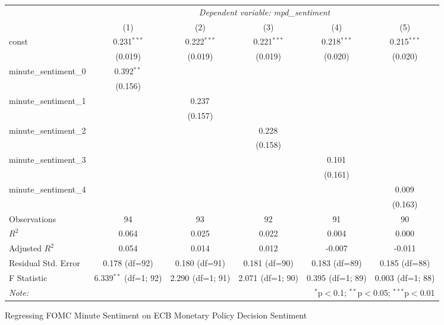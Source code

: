 \documentclass{article}
\begin{document}
\begin{table}[H] 
\centering
\begin{tabular}{@{}lccccc@{}}
\hline \hline
& \multicolumn{5}{c}{\textit{Dependent variable: mpd\_sentiment}} \\
\cline{2-6}
& (1) & (2) & (3) & (4) & (5) \\
\hline
const & 0.231$^{***}$ & 0.222$^{***}$ & 0.221$^{***}$ & 0.218$^{***}$ & 0.215$^{***}$ \\
& (0.019) & (0.019) & (0.019) & (0.020) & (0.020) \\
minute\_sentiment\_0 & 0.392$^{**}$ & & & & \\
& (0.156) & & & & \\
minute\_sentiment\_1 & & 0.237$^{}$ & & & \\
& & (0.157) & & & \\
minute\_sentiment\_2 & & & 0.228$^{}$ & & \\
& & & (0.158) & & \\
minute\_sentiment\_3 & & & & 0.101$^{}$ & \\
& & & & (0.161) & \\
minute\_sentiment\_4 & & & & & 0.009$^{}$ \\
& & & & & (0.163) \\
\hline
Observations & 94 & 93 & 92 & 91 & 90 \\
$R^2$ & 0.064 & 0.025 & 0.022 & 0.004 & 0.000 \\
Adjusted $R^2$ & 0.054 & 0.014 & 0.012 & -0.007 & -0.011 \\
Residual Std. Error & 0.178 (df=92) & 0.180 (df=91) & 0.181 (df=90) & 0.183 (df=89) & 0.185 (df=88) \\
F Statistic & 6.339$^{**}$ (df=1; 92) & 2.290$^{}$ (df=1; 91) & 2.071$^{}$ (df=1; 90) & 0.395$^{}$ (df=1; 89) & 0.003$^{}$ (df=1; 88) \\
\hline \hline
\textit{Note:} & \multicolumn{5}{r}{$^{*}$p$<$0.1; $^{**}$p$<$0.05; $^{***}$p$<$0.01} \\
\end{tabular}
\end{table}


Regressing FOMC Minute Sentiment on ECB Monetary Policy Decision Sentiment
\end{document}

